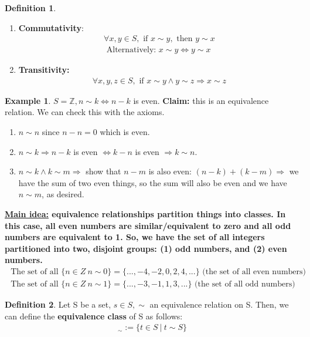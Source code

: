 \documentclass[a4paper, 12pt]{article}
\theoremstyle{definition}
\newtheorem{exmp}{Example}[section]
\theoremstyle{definition}
\newtheorem{defn}{Definition}[section]
\theoremstyle{definition}
\theoremstyle{definition}
\begin{document}
{\begin{defn}
\begin{enumerate}
	\item \textbf{Commutativity}: 
	\begin{align*}
		\forall x, y \in S, \mbox{ if } x \sim y, \mbox{ then } y \sim x \\
		\mbox{ Alternatively: } x \sim y \iff y \sim x
	\end{align*}
	\item \textbf{Transitivity:} 
	\begin{align*}
		\forall x, y, z \in S, \mbox{ if } x \sim y \land y \sim z \Rightarrow x \sim z
	\end{align*}
	\end{enumerate}
\end{defn}
\begin{exmp}
	$S = \mathbb{Z}, n \sim k \iff n-k$ is even. \textbf{Claim:} this is an equivalence relation. We can check this with the axioms. 
	\begin{enumerate}
		\item $n \sim n$ since $n-n =0$ which is even. 
		\item $n \sim k \Rightarrow n-k$ is even $\iff k-n$ is even $\Rightarrow k \sim n$. 
		\item $n \sim k \land k \sim m \Rightarrow$ show that $n-m$ is also even: $(n-k) + (k-m) \Rightarrow$ we have the sum of two even things, so the sum will also be even and we have $n \sim m$, as desired. 
	\end{enumerate}
\end{exmp}
\textbf{\underline{Main idea:} equivalence relationships partition things into classes. In this case, all even numbers are similar/equivalent to zero and all odd numbers are equivalent to 1. So, we have the set of all integers partitioned into two, disjoint groups: (1) odd numbers, and (2) even numbers.}
\begin{align*}
	\mbox{ The set of all } \{ n \in Z\  n \sim 0 \} = \{ ...,-4,-2,0,2,4,...\} \mbox{ (the set of all even numbers) } \\
		\mbox{ The set of all } \{ n \in Z\  n \sim 1 \} = \{ ...,-3,-1,1,3,...\} \mbox{ (the set of all odd numbers) } 
\end{align*}
\begin{defn}
	Let S be a set, $s \in S, \sim$ an equivalence relation on S. Then, we can define the \textbf{equivalence class} of S as follows: 
	\begin{align*}
		[s]_{\sim} := \{ t \in S\ |\ t \sim S \} 
	\end{align*}
\end{defn}
}
\end{document}
